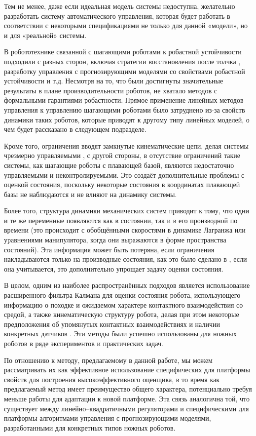 Тем не менее, даже если идеальная модель системы недоступна, желательно разработать систему автоматического управления, которая будет работать в соответствии с некоторыми спецификациями не только для данной «модели», но и для «реальной» системы.

В робототехнике связанной с шагающими роботами к робастной устойчивости подходили с разных сторон, включая стратегии восстановления после толчка \cite{Pratt2006}, разработку управления с прогнозирующими моделями со свойствами робастной устойчивости \cite{KIM2019} и т.д. Несмотря на то, что были достигнуты значительные результаты в плане производительности роботов, не хватало методов с формальными гарантиями робастности. Прямое применение линейных методов управления к управлению шагающими роботами было затруднено из-за свойств динамики таких роботов, которые приводят к другому типу линейных моделей, о чем будет рассказано в следующем подразделе.

Кроме того, ограничения вводят замкнутые кинематические цепи, делая системы чрезмерно управляемыми \cite{Furieri2017}, с другой стороны, в отсутствие ограничений такие системы, как шагающие роботы с плавающей базой, являются недостаточно управляемыми и неконтролируемыми. Это создаёт дополнительные проблемы с оценкой состояния, поскольку некоторые состояния в координатах плавающей базы не наблюдаются и не влияют на динамику системы. 

Более того, структура динамики механических систем приводит к тому, что одни и те же переменные появляются как в состоянии, так и в его производной по времени (это происходит с обобщёнными скоростями в динамике Лагранжа или уравнениями манипулятора, когда они выражаются в форме пространства состояний). Эта информация может быть потеряна, если ограничения накладываются только на производные состояния, как это было сделано в \cite{Mason2017}, если она учитывается, это дополнительно упрощает задачу оценки состояния.

В целом, одним из наиболее распространённых подходов является использование расширенного фильтра Калмана для оценки состояния робота, использующего информацию о походке и ожидаемом характере контактного взаимодействия со средой, а также кинематическую структуру робота, делая при этом некоторые предположения об упомянутых контактных взаимодействиях и наличии конкретных датчиков \cite{Bloesch2012, Teng2021}. Эти методы были успешно использованы для ножных роботов в ряде экспериментов и практических задач.

По отношению к методу, предлагаемому в данной работе, мы можем рассматривать их как эффективное использование специфических для платформы свойств для построения высокоэффективного оценщика, в то время как предлагаемый метод имеет преимущество общего характера, потенциально требуя меньше работы для адаптации к новой платформе. Эта связь аналогична той, что существует между линейно--квадратичными регуляторами и специфическими для платформы алгоритмами управления с прогнозирующими моделями, разработанными для конкретных типов ножных роботов.

